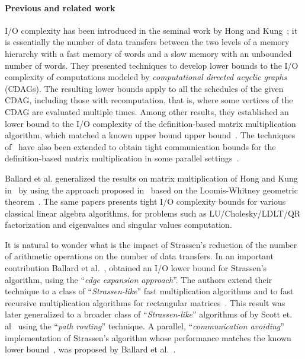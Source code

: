 \documentclass[a4paper,UKenglish]{lipics-v2016}
\newcommand{\io }{I/O }
\begin{document}
\paragraph*{Previous and related work}

\io complexity has been introduced in the seminal work by Hong and
Kung~\cite{jia1981complexity}; it is essentially the number of data
transfers between the two levels of a memory hierarchy with a fast
memory of  words and a slow memory with an unbounded number of
words. They presented techniques to develop lower bounds to the \io
complexity of computations modeled by \emph{computational directed acyclic graphs} (CDAGs). The resulting lower bounds
apply to all the schedules of the given CDAG, including those with
recomputation, that is, where some vertices of the CDAG are evaluated
multiple times. Among other results, they established an  lower bound to the \io complexity of the definition-based
matrix multiplication algorithm, which matched a known upper bound
upper bound~\cite{cannon1969cellular}. The techniques
of~\cite{jia1981complexity} have also been extended to obtain tight
communication bounds for the definition-based matrix multiplication in
some parallel settings~\cite{irony2004communication,frigo1999cache}.

Ballard et al.  generalized the results on matrix multiplication of
Hong and Kung~\cite{jia1981complexity} in~\cite{ballard2011minimizing,
  ballard2010communication} by using the approach proposed
in~\cite{irony2004communication} based on the Loomis-Whitney geometric
theorem~\cite{loomis1949,zalg}. The same papers presents tight \io
complexity bounds for various classical linear algebra algorithms, for
problems such as LU/Cholesky/LDLT/QR factorization and eigenvalues and
singular values computation. 


It is natural to wonder what is the impact of Strassen's reduction of
the number of arithmetic operations on the number of data transfers.
In an important contribution Ballard et
al.~\cite{ballard2012graph}, obtained an
 \io lower bound for Strassen's
algorithm, using the ``\emph{edge expansion approach}''. The authors
extend their technique to a class of ``\emph{Strassen-like}'' fast
multiplication algorithms and to fast recursive multiplication
algorithms for rectangular matrices~\cite{ballard2012graphrec}. This
result was later generalized to a broader class of
``\emph{Strassen-like}'' algorithms of by Scott
et. al~\cite{scott2015matrix} using the ``\emph{path routing}''
technique.  A parallel, ``\emph{communication avoiding}''
implementation of Strassen's algorithm whose performance matches the
known lower bound~\cite{ballard2012graph,scott2015matrix}, was
proposed by Ballard et al.~\cite{ballard2012communicationalg}.
\end{document}
